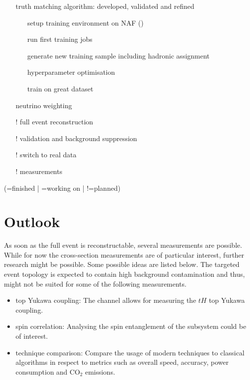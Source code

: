 \documentclass[bachelor,ngerman,english]{GAUBM}
\begin{document}
\begin{itemize}[nosep]
    \item[\ding{52}] truth matching algorithm: developed, validated and refined
    \item[\ding{220}] \spanet 
    \begin{itemize}
        \item[\ding{52}] setup training environment on NAF (\desy)
        \item[\ding{52}] run first \spanet training jobs
        \item[\ding{220}] generate new training sample including hadronic \HWW assignment
        \item[\ding{220}] hyperparameter optimisation
        \item[\ding{220}] train on great dataset
    \end{itemize}
    \item[\ding{220}] neutrino weighting
    \item[!] full event reconstruction
    \item[!] validation and background suppression
    \item[!] switch to real data
    \item[!] measurements
\end{itemize}

\begin{center}
    (=finished | =working on | !=planned)
\end{center}


\section{Outlook}
\label{sec:status:outlook}
As soon as the full event is reconstructable, several measurements are possible. While for now the cross-section measurements are of particular interest, further research might be possible. Some possible ideas are listed below. The targeted event topology is expected to contain high background contamination and thus, might not be suited for some of the following measurements.

\begin{itemize}
    \item top Yukawa coupling: The channel allows for measuring the $tH$ top Yukawa coupling.
    \item spin correlation: Analysing the spin entanglement of the \HWW subsystem could be of interest.
    \item technique comparison: Compare the usage of modern techniques to classical algorithms in respect to metrics such as overall speed, accuracy, power consumption and CO$_2$ emissions.
\end{itemize}


 
\end{document}
